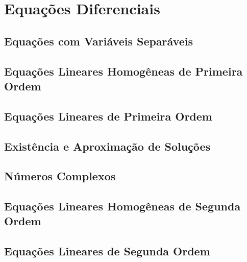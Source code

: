 \chapter{Equações Diferenciais}
\label{chp:diffeq}

\section{Equações com Variáveis Separáveis}
\label{sec:separablevars}

\section{Equações Lineares Homogêneas de Primeira Ordem}
\label{sec:linearhomo1ode}

\section{Equações Lineares de Primeira Ordem}
\label{sec:linearode1}

\section{Existência e Aproximação de Soluções}
\label{sec:existsolode}

\section{Números Complexos}
\label{sec:complexnumbers}

\section{Equações Lineares Homogêneas de Segunda Ordem}
\label{sec:linearhomo2ode}

\section{Equações Lineares de Segunda Ordem}
\label{sec:sec:linearode1}

\begin{chapterproblems}
\end{chapterproblems}
